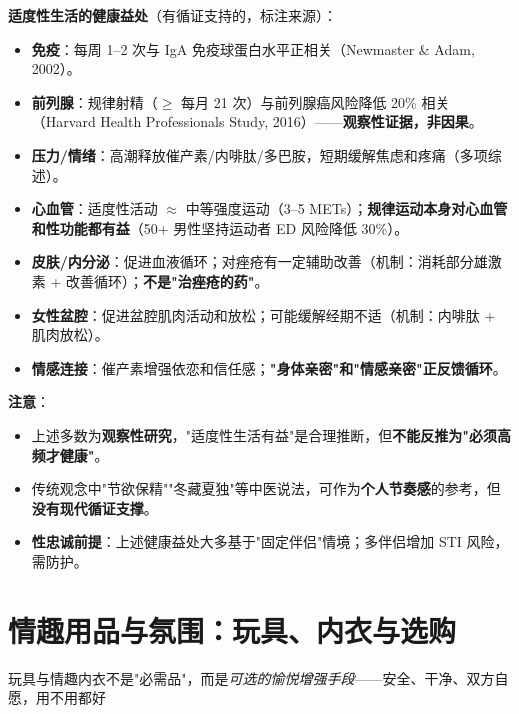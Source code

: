 \documentclass[12pt,UTF8,openany]{ctexbook}
\begin{document}
\textbf{适度性生活的健康益处}（有循证支持的，标注来源）：

\begin{itemize}[leftmargin=2em,itemsep=0.3em]
  \item \textbf{免疫}：每周 1--2 次与 IgA 免疫球蛋白水平正相关（Newmaster \& Adam, 2002）。
  \item \textbf{前列腺}：规律射精（$\geq$ 每月 21 次）与前列腺癌风险降低 20\% 相关（Harvard Health Professionals Study, 2016）——\textbf{观察性证据，非因果}。
  \item \textbf{压力/情绪}：高潮释放催产素/内啡肽/多巴胺，短期缓解焦虑和疼痛（多项综述）。
  \item \textbf{心血管}：适度性活动 $\approx$ 中等强度运动（3--5 METs）；\textbf{规律运动本身对心血管和性功能都有益}（50+ 男性坚持运动者 ED 风险降低 30\%）。
  \item \textbf{皮肤/内分泌}：促进血液循环；对痤疮有一定辅助改善（机制：消耗部分雄激素 + 改善循环）；\textbf{不是"治痤疮的药"}。
  \item \textbf{女性盆腔}：促进盆腔肌肉活动和放松；可能缓解经期不适（机制：内啡肽 + 肌肉放松）。
  \item \textbf{情感连接}：催产素增强依恋和信任感；\textbf{"身体亲密"和"情感亲密"正反馈循环}。
\end{itemize}

\noindent\textbf{注意}：
\begin{itemize}[leftmargin=2em,itemsep=0.2em]
  \item 上述多数为\textbf{观察性研究}，"适度性生活有益"是合理推断，但\textbf{不能反推为"必须高频才健康"}。
  \item 传统观念中"节欲保精""冬藏夏独"等中医说法，可作为\textbf{个人节奏感}的参考，但\textbf{没有现代循证支撑}。
  \item \textbf{性忠诚前提}：上述健康益处大多基于"固定伴侣"情境；多伴侣增加 STI 风险，需防护。
\end{itemize}

\chapter{情趣用品与氛围：玩具、内衣与选购}

\begin{center}
\myhei\large 玩具与情趣内衣不是"必需品"，而是\emph{可选的愉悦增强手段}——安全、干净、双方自愿，用不用都好
\end{center}
\end{document}
